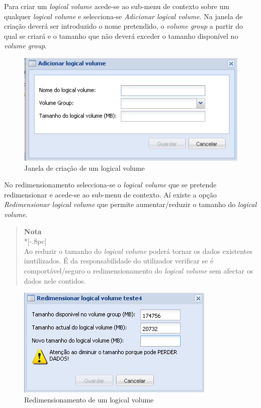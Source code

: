 Para criar um \emph{logical volume} acede-se ao sub-menu de contexto sobre um qualquer \emph{logical volume} e selecciona-se \emph{Adicionar logical volume}.
Na janela de criação deverá ser introduzido o nome pretendido, o \emph{volume group} a partir do qual se criará e o tamanho que não deverá exceder o tamanho disponível no \emph{volume group}.

\begin{figure}[H]
        \begin{center}
        \includegraphics[scale=0.5]{screenshots/storage_lv_create.png}
        \caption{Janela de criação de um logical volume}
        \label{fig:storage_lv_create}
        \end{center}
\end{figure}

No redimensionamento selecciona-se o \emph{logical volume} que se pretende redimensionar e acede-se ao sub-menu de contexto. Aí existe a opção \emph{Redimensionar logical volume} que permite aumentar/reduzir o tamanho do \emph{logical volume}.


\begin{quote}
	{\large \bf Nota} \\*[-.8pc]
	\underline{\hspace{6in}} \\
	Ao reduzir o tamanho do \emph{logical volume} poderá tornar os dados existentes inutilizados. É da responsabilidade do utilizador verificar se é comportável/seguro o redimensionamento do \emph{logical volume} sem afectar os dados nele contidos.
\end{quote}


\begin{figure}[H]
        \begin{center}
        \includegraphics[scale=0.5]{screenshots/storage_lv_resize.png}
        \caption{Redimensionamento de um logical volume}
        \label{fig:storage_lv_resize}
        \end{center}
\end{figure}

